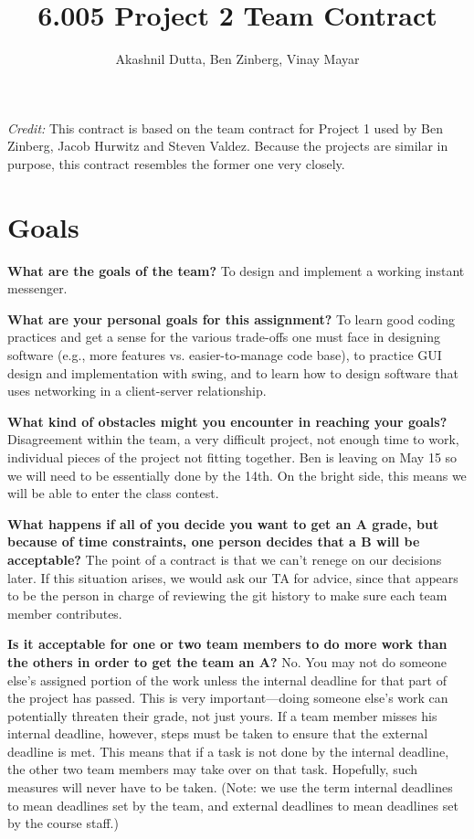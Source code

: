 \documentclass[11pt]{article}
\title{6.005 Project 2 Team Contract}
\author{Akashnil Dutta, Ben Zinberg, Vinay Mayar}
\newcommand{\question}[2]{{\noindent\bf #1}\newline #2 \newline}
\begin{document}
\maketitle

{\em Credit:} This contract is based on the team contract for Project 1 used by Ben Zinberg, Jacob Hurwitz and Steven Valdez.  Because the projects are similar in purpose, this contract resembles the former one very closely.

\section{Goals}
\question{What are the goals of the team?}{
To design and implement a working instant messenger.}

\question{What are your personal goals for this assignment?}{
To learn good coding practices and get a sense for the various trade-offs one must face in designing software (e.g., more features vs. easier-to-manage code base), to practice GUI design and implementation with swing, and to learn how to design software that uses networking in a client-server relationship.}

\question{What kind of obstacles might you encounter in reaching your goals?}{
Disagreement within the team, a very difficult project, not enough time to work, individual pieces of the project not fitting together.  Ben is leaving on May 15 so we will need to be essentially done by the 14th.  On the bright side, this means we will be able to enter the class contest.}

\question{What happens if all of you decide you want to get an A grade, but because of time constraints, one person decides that a B will be acceptable?}{
The point of a contract is that we can't renege on our decisions later. If this situation arises, we would ask our TA for advice, since that appears to be the person in charge of reviewing the git history to make sure each team member contributes.}

\question{Is it acceptable for one or two team members to do more work than the others in order to get the team an A?}{
No.  You may not do someone else's assigned portion of the work unless the internal deadline for that part of the project has passed.  This is very important---doing someone else's work can potentially threaten their grade, not just yours.  If a team member misses his internal deadline, however, steps must be taken to ensure that the external deadline is met.  This means that if a task is not done by the internal deadline, the other two team members may take over on that task.  Hopefully, such measures will never have to be taken. (Note: we use the term internal deadlines to mean deadlines set by the team, and external deadlines to mean deadlines set by the course staff.)}
\end{document}
